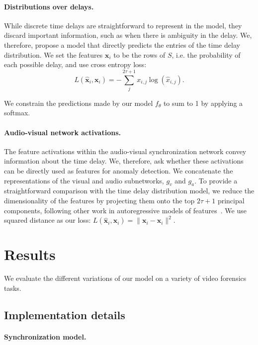 \documentclass[10pt,twocolumn,letterpaper]{article}
\newcommand{\bx}[0]{{\mathbf x}}
\newcommand{\mypar}[1]{\vspace{-3mm}\paragraph{#1}}
\begin{document}
\mypar{Distributions over delays.}\label{kl-model} 
While discrete time delays are straightforward to represent in the model, they discard important information, such as when there is ambiguity in the delay.
We, therefore, propose a model that directly predicts the entries of the time delay distribution. 
We set the features $\bx_i$ to be the rows of $S$, i.e. the probability of each possible delay, and use cross entropy loss:
\begin{equation}
    L(\hat \bx_i, \bx_i) = - \sum_j^{2\tau+1} x_{i,j} \log(\hat x_{i,j}).
\end{equation}

We constrain the predictions made by our model $f_\theta$ to sum to 1 by applying a softmax.






\mypar{Audio-visual network activations.}
The feature activations within the audio-visual synchronization network convey information about the time delay. We, therefore, ask whether these activations can be directly used as features for anomaly detection. We concatenate the representations of the visual and audio subnetworks, $g_v$ and $g_a$. To provide a straightforward comparison with the time delay distribution model, we reduce the dimensionality of the features by projecting them onto the top $2\tau + 1$ principal components, following other work in autoregressive models of features~\cite{ramesh2022hierarchical}. We use squared distance as our loss: $L\left(\hat{\mathbf{x}}_i, \mathbf{x}_i\right) = \lVert \bx_i - \hat \bx_i \rVert^2$.










 
\section{Results}
We evaluate the different variations of our model on a variety of video forensics tasks. 

\subsection{Implementation details}
\label{implementation}
\paragraph{Synchronization model.} 
\end{document}
